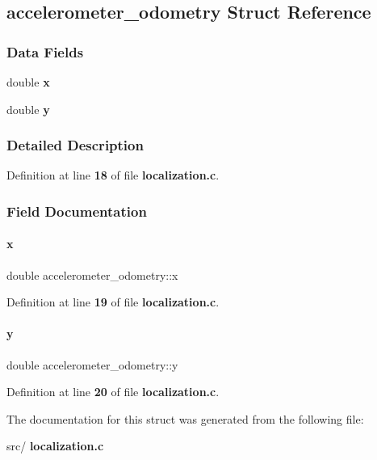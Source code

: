 \subsection{accelerometer\+\_\+odometry Struct Reference}
\label{a00207}
\subsubsection*{Data Fields}
\begin{DoxyCompactItemize}
\item 
double \textbf{ x}
\item 
double \textbf{ y}
\end{DoxyCompactItemize}


\subsubsection{Detailed Description}


Definition at line \textbf{ 18} of file \textbf{ localization.\+c}.



\subsubsection{Field Documentation}
\mbox{\label{a00207_a83af671d99413a7c480678d5abb9c64a}} 
\paragraph{x}
{\footnotesize\ttfamily double accelerometer\+\_\+odometry\+::x}



Definition at line \textbf{ 19} of file \textbf{ localization.\+c}.

\mbox{\label{a00207_a4d812f516efdd477ae9f74fca2a07a2b}} 
\paragraph{y}
{\footnotesize\ttfamily double accelerometer\+\_\+odometry\+::y}



Definition at line \textbf{ 20} of file \textbf{ localization.\+c}.



The documentation for this struct was generated from the following file\+:\begin{DoxyCompactItemize}
\item 
src/\textbf{ localization.\+c}\end{DoxyCompactItemize}
